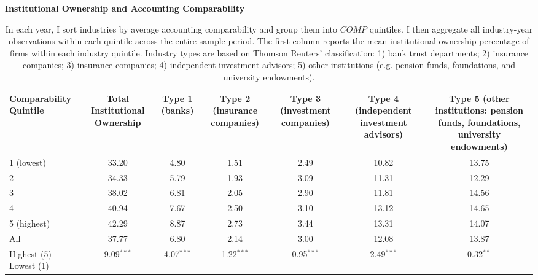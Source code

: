 \begin{table}[H]
\Fontvi
\centering
  \caption{\textbf{Institutional Ownership and Accounting Comparability}}
  \caption*{\Fontvi In each year, I sort industries by average accounting comparability and group them into $COMP$ quintiles. I then aggregate all industry-year observations within each quintile across the entire sample period. The first column reports the mean institutional ownership percentage of firms within each industry quintile. Industry types are based on Thomson Reuters' classification: 1) bank trust departments; 2) insurance companies; 3) insurance companies; 4) independent investment advisors; 5) other institutions (e.g. pension funds, foundations, and university endowments).}
\begin{tabular}{lcccccc}
\toprule
\multicolumn{1}{L{2cm}}{Comparability Quintile} & \multicolumn{1}{C{2cm}}{Total Institutional Ownership}& \multicolumn{1}{C{1cm}}{Type 1 (banks)}& \multicolumn{1}{C{2cm}}{Type 2 (insurance companies)} & \multicolumn{1}{C{2cm}}{Type 3 (investment companies)} & \multicolumn{1}{C{2cm}}{Type 4 (independent investment advisors)}   & \multicolumn{1}{C{2cm}}{Type 5 (other institutions: pension funds, foundations, university endowments)} \\ 
\midrule 
    1 (lowest) & 33.20 & 4.80 & 1.51 & 2.49 & 10.82 & 13.75 \\
    2     & 34.33 & 5.79 & 1.93 & 3.09 & 11.31 & 12.29 \\
    3     & 38.02 & 6.81 & 2.05 & 2.90 & 11.81 & 14.56 \\
    4     & 40.94 & 7.67 & 2.50 & 3.10 & 13.12 & 14.65 \\
    5 (highest) & 42.29 & 8.87 & 2.73 & 3.44 & 13.31 & 14.07 \\
    All   & 37.77 & 6.80 & 2.14 & 3.00 & 12.08 & 13.87 \\
    Highest (5) - Lowest (1) & 9.09$^{***}$  & 4.07$^{***}$ & 1.22$^{***}$ & 0.95$^{***}$ &2.49$^{***}$ &0.32$^{**}$  \\
    \bottomrule
    \end{tabular} 
  \label{ior-by-q-acctcomp}
\end{table}%
